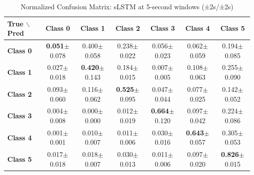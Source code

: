 \begin{table}[htbp]
\centering
\caption{Normalized Confusion Matrix: sLSTM at 5-second windows (±2s/±2s)}
\label{tab:app_cm_slstm_5s}
\small
\setlength{\tabcolsep}{2pt}
\begin{tabular}{lcccccc}
	\toprule
	\textbf{True $\backslash$ Pred} & \textbf{Class 0} & \textbf{Class 1} & \textbf{Class 2} & \textbf{Class 3} & \textbf{Class 4} & \textbf{Class 5} \\
\midrule
	\textbf{Class 0} & \textbf{0.051}$\pm$0.078 & 0.400$\pm$0.058 & 0.238$\pm$0.022 & 0.056$\pm$0.023 & 0.062$\pm$0.059 & 0.194$\pm$0.085 \\
	\textbf{Class 1} & 0.027$\pm$0.018 & \textbf{0.420}$\pm$0.143 & 0.184$\pm$0.015 & 0.007$\pm$0.005 & 0.108$\pm$0.063 & 0.255$\pm$0.090 \\
	\textbf{Class 2} & 0.093$\pm$0.060 & 0.116$\pm$0.062 & \textbf{0.525}$\pm$0.095 & 0.047$\pm$0.044 & 0.077$\pm$0.025 & 0.142$\pm$0.052 \\
	\textbf{Class 3} & 0.004$\pm$0.008 & 0.000$\pm$0.000 & 0.012$\pm$0.019 & \textbf{0.664}$\pm$0.120 & 0.097$\pm$0.042 & 0.224$\pm$0.086 \\
	\textbf{Class 4} & 0.001$\pm$0.001 & 0.010$\pm$0.007 & 0.011$\pm$0.006 & 0.030$\pm$0.016 & \textbf{0.643}$\pm$0.057 & 0.305$\pm$0.053 \\
	\textbf{Class 5} & 0.017$\pm$0.018 & 0.018$\pm$0.007 & 0.030$\pm$0.013 & 0.011$\pm$0.006 & 0.097$\pm$0.020 & \textbf{0.826}$\pm$0.015 \\
\bottomrule
\end{tabular}
\setlength{\tabcolsep}{6pt}
\end{table}

